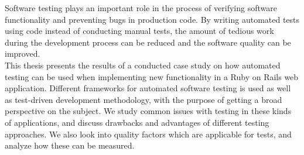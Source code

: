 Software testing plays an important role in the process of verifying
software functionality and preventing bugs in production code. By
writing automated tests using code instead of conducting manual tests,
the amount of tedious work during the development process can be reduced
and the software quality can be improved.\\

This thesis presents the results of a conducted case study on how
automated testing can be used when implementing new functionality in a
Ruby on Rails web application. Different frameworks for automated
software testing is used as well as test-driven development methodology,
with the purpose of getting a broad perspective on the subject. We study
common issues with testing in these kinds of applications, and discuss
drawbacks and advantages of different testing approaches. We also look
into quality factors which are applicable for tests, and analyze how
these can be measured.\\
